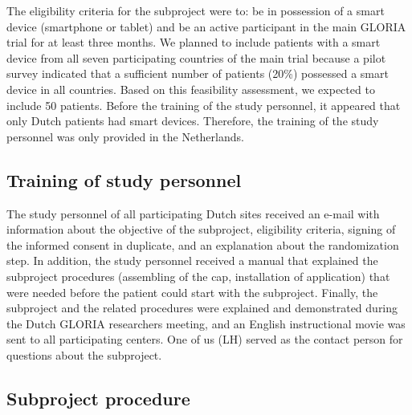 \documentclass[twocolumn, serif, empirical, authordate]{jote-article}
\begin{document}
 The eligibility criteria for the subproject were to: be in possession of a smart device (smartphone or tablet) and be an active participant in the main GLORIA trial for at least three months. We planned to include patients with a smart device from all seven participating countries of the main trial because a pilot survey indicated that a sufficient number of patients (20\%) possessed a smart device in all countries. Based on this feasibility assessment, we expected to include 50 patients.
 Before the training of the study personnel, it appeared that only Dutch patients had smart devices. Therefore, the training of the study personnel was only provided in the Netherlands.


\subsection*{Training of study personnel}

 The study personnel of all participating Dutch sites received an e-mail with information about the objective of the subproject, eligibility criteria, signing of the informed consent in duplicate, and an explanation about the randomization step. In addition, the study personnel received a manual that explained the subproject procedures (assembling of the cap, installation of application) that were needed before the patient could start with the subproject. Finally, the subproject and the related procedures were explained and demonstrated during the Dutch GLORIA researchers meeting, and an English instructional movie was sent to all participating centers. One of us (LH) served as the contact person for questions about the subproject.


\subsection*{Subproject procedure}
\end{document}
